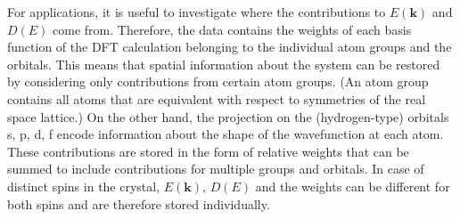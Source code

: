 For applications, it is useful to investigate where the contributions to $E(\mathbf{k})$ and $D(E)$ come from. Therefore, the data contains the weights of each basis function of the DFT calculation belonging to the individual atom groups and the orbitals. This means that spatial information about the system can be restored by considering only contributions from certain atom groups. (An atom group contains all atoms that are equivalent with respect to symmetries of the real space lattice.) On the other hand, the projection on the (hydrogen-type) orbitals s, p, d, f encode information about the shape of the wavefunction at each atom. These contributions are stored in the form of relative weights that can be summed to include contributions for multiple groups and orbitals. In case of distinct spins in the crystal, $E(\mathbf{k})$, $D(E)$ and the weights can be different for both spins and are therefore stored individually.



